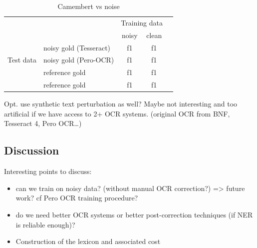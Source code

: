 \begin{table}[h!]
\caption{Camembert vs noise}
\centering
\begin{tabular}{ll|cc|c}
 & & \multicolumn{2}{c|}{Training data} & \\
 & & noisy & clean &   \\ 
\cline{1-4}
\multirow{3}{*}{Test data}& noisy gold (Tesseract) & f1 & f1 & \\
                            & noisy gold (Pero-OCR) & f1 & f1 & \\ 
                            & reference gold & f1 & f1 & \\ 
                            & reference gold & f1 & f1 & \\
\cline{1-4}
\end{tabular}
\end{table}



Opt. use synthetic text perturbation as well? Maybe not interesting and too artificial if we have access to 2+ OCR systems.
(original OCR from BNF, Tesseract 4, Pero OCR…)


\subsection{Discussion}
Interesting points to discuss:
\begin{itemize}
    \item can we train on noisy data? (without manual OCR correction?) => future work? cf Pero OCR training procedure?
    \item do we need better OCR systems or better post-correction techniques (if NER is reliable enough)?
    \item Construction of the lexicon and associated cost
\end{itemize}
